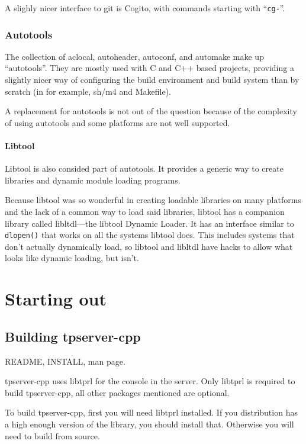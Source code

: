 \documentclass[a4paper,11pt]{report}
\begin{document}
A slighly nicer interface to git is Cogito, with commands starting with ``\texttt{cg-}''.

\section{Autotools}
\label{sec:autotools}

The collection of aclocal, autoheader, autoconf, and automake make up ``autotools''. They are mostly used with C and C++ based projects, providing a slightly nicer way of configuring the build environment and build system than by scratch (in for example, sh/m4 and Makefile).

A replacement for autotools is not out of the question because of the complexity of using autotools and some platforms are not well supported.

\subsection{Libtool}
\label{sec:libtool}

Libtool is also consided part of autotools. It provides a generic way to create libraries and dynamic module loading programs.

Because libtool was so wonderful in creating loadable libraries on many platforms and the lack of a common way to load said libraries, libtool has a companion library called libltdl---the libtool Dynamic Loader.  It has an interface similar to \texttt{dlopen()} that works on all the systems libtool does. This includes systems that don't actually dynamically load, so libtool and libltdl have hacks to allow what looks like dynamic loading, but isn't.


\part{Starting out}
\label{part:starting}

\chapter{Building tpserver-cpp}
\label{chap:building-tpserver-cpp}

README, INSTALL, man page.

tpserver-cpp uses libtprl for the console in the server. Only libtprl is required to build tpserver-cpp, all other packages mentioned are optional.


To build tpserver-cpp, first you will need libtprl installed. If you distribution has a high enough version of the library, you should install that. Otherwise you will need to build from source.
\end{document}
